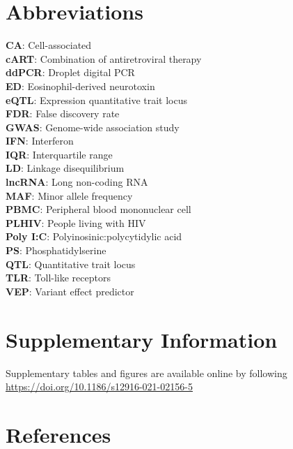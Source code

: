 \documentclass{book}
\begin{document}
\begin{refsection}
\section*{Abbreviations}
\textbf{CA}: Cell-associated \\
\textbf{cART}: Combination of antiretroviral therapy \\
\textbf{ddPCR}: Droplet digital PCR \\
\textbf{ED}: Eosinophil-derived neurotoxin \\
\textbf{eQTL}: Expression quantitative trait locus \\
\textbf{FDR}: False discovery rate \\
\textbf{GWAS}: Genome-wide association study \\
\textbf{IFN}: Interferon \\
\textbf{IQR}: Interquartile range \\
\textbf{LD}: Linkage disequilibrium \\
\textbf{lncRNA}: Long non-coding RNA \\
\textbf{MAF}: Minor allele frequency \\
\textbf{PBMC}: Peripheral blood mononuclear cell \\
\textbf{PLHIV}: People living with HIV \\
\textbf{Poly I:C}: Polyinosinic:polycytidylic acid \\
\textbf{PS}: Phosphatidylserine \\
\textbf{QTL}: Quantitative trait locus \\
\textbf{TLR}: Toll-like receptors \\
\textbf{VEP}: Variant effect predictor

\section*{Supplementary Information}
Supplementary tables and figures are available online by following \url{https://doi.org/10.1186/s12916-021-02156-5}

\section*{References}
\printbibliography[heading=none]

\clearpage

\end{refsection}
\end{document}
